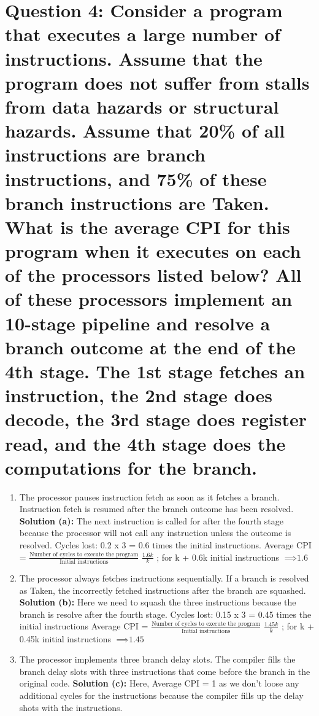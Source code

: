 \documentclass[11pt]{article}
\newenvironment{qparts}{\begin{enumerate}[{(}a{)}]}{\end{enumerate}}
\begin{document}
\section*{Question 4: Consider a program that executes a large number of instructions. Assume that the program does not suffer from stalls from data hazards or structural hazards. Assume that 20\% of all instructions are branch instructions, and 75\% of these branch instructions are Taken. What is the average CPI for this program when it executes on each of the processors listed below? All of these processors implement an 10-stage pipeline and resolve a branch outcome at the end of the 4th stage. The 1st stage fetches an instruction, the 2nd stage does decode, the 3rd stage does register read, and the 4th stage does the computations for the branch.}
\begin{qparts}
	\item The processor pauses instruction fetch as soon as it fetches a branch. Instruction fetch is resumed after the branch outcome has been resolved.
	\newline 
	\textbf{Solution (a): }
	The next instruction is called for after the fourth stage because the processor will not call any instruction unless the outcome is resolved.
	Cycles lost: 0.2 x 3 = 0.6 times the initial instructions.
	\newline
	Average CPI = $\frac{\text{Number of cycles to execute the program}}{\text{Initial instructions}}$ 
	\newline 
	$\frac{1.6k}{k}$ ; for k + 0.6k  initial instructions
	$\implies \text{1.6}$
	
	\newline 
	\item The processor always fetches instructions sequentially. If a branch is resolved as Taken, the incorrectly fetched instructions after the branch are squashed.
	\newline 
	\textbf{Solution (b): } 
	Here we need to squash the three instructions because the branch is resolve after the fourth stage.
	\newline 
	Cycles lost: 0.15 x 3 = 0.45 times the initial instructions
	\newline 
	Average CPI = $\frac{\text{Number of cycles to execute the program}}{\text{Initial instructions}}$ 
	\newline 
	$\frac{1.45k}{k}$ ; for k + 0.45k  initial instructions
	$\implies \text{1.45}$
	
	\item 
	The processor implements three branch delay slots. The compiler fills the branch delay slots with three instructions that come before the branch in the original code. 
	\newline 
	\textbf{Solution (c): }
	Here, Average CPI = 1 as we don't loose any additional cycles for the instructions because the compiler fills up the delay shots with the instructions.
	

\end{qparts}
\end{document}
